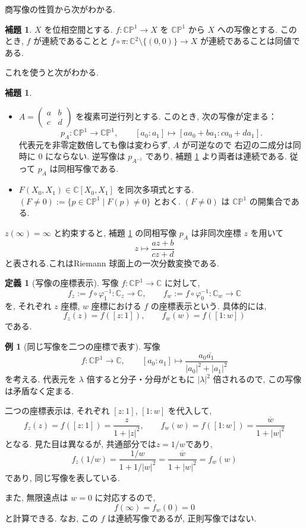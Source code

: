 \documentclass[dvipdfmx,a4paper,11pt]{article} %
\newcommand{\C}{\mathbb{C}}
\theoremstyle{definition}
\numberwithin{equation}{section}
\newtheorem{lem}[thm]{補題}
\newtheorem{dfn}[thm]{定義}
\newtheorem{exa}[thm]{例}
\begin{document}
商写像の性質から次がわかる. 
\begin{lem}\label{O-M006}
$X$ を位相空間とする. $f:\C\mathbb P^1\to X$ を $\C\mathbb P^1$ から $X$ への写像とする. このとき, $f$ が連続であることと $f\circ \pi:\C{}^2\setminus \{(0,0)\}\to X$ が連続であることは同値である. 
\end{lem}


これを使うと次がわかる. 
\begin{lem}\label{O-M007}

\begin{itemize}

\item
\(
A=\begin{pmatrix}a&b\\ c&d\end{pmatrix}
\)
を複素可逆行列とする. このとき, 次の写像が定まる：
\[
p_A:\C\mathbb P^1\longrightarrow\C\mathbb P^1,\qquad
[a_0:a_1]\longmapsto[aa_0+ba_1:ca_0+da_1].
\]
代表元を非零定数倍しても像は変わらず, $A$ が可逆なので
右辺の二成分は同時に $0$ にならない.
逆写像は $p_{A^{-1}}$ であり, 補題 \ref{O-M006} より両者は連続である.
従って $p_A$ は同相写像である.
\item $F(X_0,X_1)\in \C{}[X_0,X_1]$ を同次多項式とする. $(F\neq 0):=\{p\in \C\mathbb P^1\mid F(p)\neq 0\}$ とおく. $(F\neq 0)$ は $\C\mathbb P^1$ の開集合である. 
\end{itemize}
\end{lem}

$z(\infty)=\infty$ と約束すると, 補題 \ref{O-M007} の同相写像 $p_A$ は非同次座標 $z$ を用いて
\[
z\longmapsto \frac{az+b}{cz+d}
\]
と表される.これはRiemann 球面上の一次分数変換である.



\begin{dfn}[写像の座標表示]
写像 $f:\C\mathbb P^1\to\C$ に対して,
\[
f_z:=f\circ\varphi_1^{-1}:\C_z\to\C,\qquad
f_w:=f\circ\varphi_0^{-1}:\C_w\to\C
\]
を, それぞれ $z$ 座標, $w$ 座標における
$f$ の座標表示という.
具体的には,
\[
f_z(z)=f([z:1]),\qquad f_w(w)=f([1:w])
\]
である.
\end{dfn}

\begin{exa}[同じ写像を二つの座標で表す]
写像
\[
f:\C\mathbb P^1\longrightarrow\C,\qquad
[a_0:a_1]\longmapsto
\frac{a_0\overline{a_1}}{|a_0|^2+|a_1|^2}
\]
を考える.
代表元を $\lambda$ 倍すると分子・分母がともに
$|\lambda|^2$ 倍されるので, この写像は矛盾なく定まる.

二つの座標表示は, それぞれ $[z:1]$, $[1:w]$ を代入して,
\[
f_z(z)=f([z:1])=\frac{z}{1+|z|^2},
\qquad
f_w(w)=f([1:w])=\frac{\overline w}{1+|w|^2}
\]
となる.
見た目は異なるが, 共通部分では$z=1/w$であり, 
\[
f_z(1/w)
=\frac{1/w}{1+1/|w|^2}
=\frac{\overline w}{1+|w|^2}
=f_w(w)
\]
であり, 同じ写像を表している.

また, 無限遠点は $w=0$ に対応するので,
\[
f(\infty)=f_w(0)=0
\]
と計算できる.
なお, この $f$ は連続写像であるが, 正則写像ではない.
\end{exa}
\end{document}
